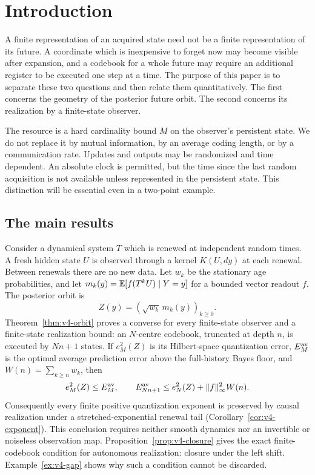 \section{Introduction}\label{sec:v4-introduction}

A finite representation of an acquired state need not be a finite
representation of its future. A coordinate which is inexpensive to
forget now may become visible after expansion, and a codebook for a
whole future may require an additional register to be executed one
step at a time. The purpose of this paper is to separate these two
questions and then relate them quantitatively. The first concerns
the geometry of the posterior future orbit. The second concerns its
realization by a finite-state observer.

The resource is a hard cardinality bound $M$ on the observer's
persistent state. We do not replace it by mutual information, by an
average coding length, or by a communication rate. Updates and
outputs may be randomized and time dependent. An absolute clock
is permitted, but the time since the last random acquisition is not
available unless represented in the persistent state. This distinction
will be essential even in a two-point example.

\subsection{The main results}
Consider a dynamical system $T$ which is renewed at independent
random times. A fresh hidden state $U$ is observed through a kernel
$K(U,dy)$ at each renewal. Between renewals there are no new data.
Let $w_k$ be the stationary age probabilities, and let
$m_k(y)=\mathbb E[f(T^kU)\mid Y=y]$ for a bounded vector readout $f$.
The posterior orbit is
\[
 Z(y)=(\sqrt{w_k}\,m_k(y))_{k\ge0}.
\]
Theorem~\ref{thm:v4-orbit} proves a converse for every finite-state
observer and a finite-state realization bound: an $N$-centre
codebook, truncated at depth $n$, is executed by $Nn+1$ states.
If $e_M^2(Z)$ is its Hilbert-space quantization error, $E_M^{\rm av}$
is the optimal average prediction error above the full-history Bayes
floor, and $W(n)=\sum_{k\ge n}w_k$, then
\begin{equation}
 e_M^2(Z)\le E_M^{\rm av},\qquad
 E_{Nn+1}^{\rm av}\le e_N^2(Z)+\|f\|_\infty^2W(n).              \label{eq:v4-intro-sandwich}
\end{equation}
Consequently every finite positive quantization exponent is preserved
by causal realization under a stretched-exponential renewal tail
(Corollary~\ref{cor:v4-exponent}). This conclusion requires neither
smooth dynamics nor an invertible or noiseless observation map.
Proposition~\ref{prop:v4-closure} gives the exact finite-codebook
condition for autonomous realization: closure under the left shift.
Example~\ref{ex:v4-gap} shows why such a condition cannot be discarded.

